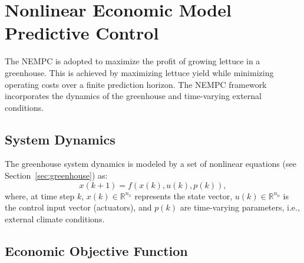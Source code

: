 \documentclass[conference]{IEEEtran}
\newcommand{\ui}[2]{#1_{\mathrm{#2}}}
\begin{document}






\section{Nonlinear Economic Model Predictive Control}\label{sec:mpc}
The NEMPC is adopted to maximize the profit of growing lettuce in a greenhouse. This is achieved by maximizing lettuce yield while minimizing operating costs over a finite prediction horizon. The NEMPC framework incorporates the dynamics of the greenhouse and time-varying external conditions.

\subsection{System Dynamics}\label{subsec:mpc_dynamics}

The greenhouse system dynamics is modeled by a set of nonlinear equations (see Section~\ref{sec:greenhouse}) as:
\begin{equation}
    x(k+1) = f\left( x(k), u(k), p(k) \right),
\end{equation}
where, at time step \(k\), \(x(k) \in \mathbb{R}^{n_x}\) represents the state vector, \(u(k) \in \mathbb{R}^{n_u}\) is the control input vector (actuators), and \(p(k)\) are time-varying parameters, i.e., external climate conditions.

\subsection{Economic Objective Function}\label{subsec:mpc_objective}
\end{document}
